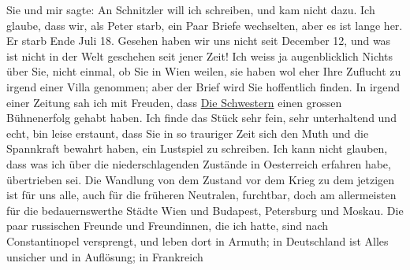\begin{ledgroupsized}[t]{13cm}
               Sie \label{T_L02342_2v}\label{T_L02342_2h} und mir sagte: An Schnitzler will ich
               schreiben, und kam nicht dazu.\pend
           \pstart
           Ich glaube, dass wir, als Peter starb, ein Paar
               Briefe wechselten, aber es ist lange her. Er starb Ende Juli 18. Gesehen
               haben wir uns nicht seit December 12, und was ist nicht in der Welt
               geschehen seit jener Zeit!\pend
           \pstart
           Ich weiss ja augenblicklich Nichts über Sie, nicht einmal, ob Sie in Wien weilen, sie haben wol eher Ihre Zuflucht zu irgend einer
               Villa genommen; aber der Brief wird Sie hoffentlich finden.\pend
           \pstart
           In irgend einer Zeitung sah ich mit Freuden, dass \uline{Die Schwestern} einen grossen Bühnenerfolg gehabt haben. Ich finde das Stück sehr fein, sehr
               unterhaltend und echt, bin leise erstaunt, {\pb}dass Sie in so trauriger Zeit sich
               den Muth und die Spannkraft bewahrt haben, ein Lustspiel zu schreiben. Ich kann nicht
               glauben, dass was ich über die niederschlagenden Zustände in Oesterreich erfahren habe, übertrieben sei. Die Wandlung von dem
               Zustand vor dem Krieg zu dem jetzigen ist für uns alle, auch für die früheren
               Neutralen, furchtbar, doch am allermeisten für die bedauernswerthe Städte Wien und Budapest,
                  Petersburg und Moskau. Die paar russischen Freunde und
               Freundinnen, die ich hatte, sind nach Constantinopel
               versprengt, und leben dort in Armuth; in Deutschland
               ist Alles unsicher und in Auflösung; in Frankreich

\end{ledgroupsized}
